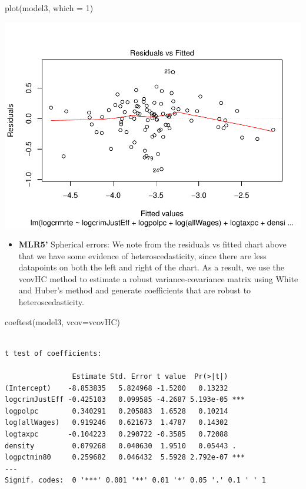 \documentclass[]{article}
\newenvironment{Shaded}{}{}
\newcommand{\DataTypeTok}[1]{#1}
\newcommand{\DecValTok}[1]{#1}
\newcommand{\KeywordTok}[1]{\textcolor[rgb]{0.00,0.00,1.00}{#1}}
\newcommand{\NormalTok}[1]{#1}
\providecommand{\tightlist}{%
  \setlength{\itemsep}{0pt}\setlength{\parskip}{0pt}}
\begin{document}
\begin{Shaded}
\begin{Highlighting}[]
\KeywordTok{plot}\NormalTok{(model3, }\DataTypeTok{which =} \DecValTok{1}\NormalTok{)}
\end{Highlighting}
\end{Shaded}

\includegraphics{Bagnard_Gaustad_Hartman_Leung_Lab_3_files/figure-latex/unnamed-chunk-102-1.pdf}

\begin{itemize}
\tightlist
\item
  \textbf{MLR5'} Spherical errors: We note from the residuals vs fitted
  chart above that we have some evidence of heteroscedasticity, since
  there are less datapoints on both the left and right of the chart. As
  a result, we use the vcovHC method to estimate a robust
  variance-covariance matrix using White and Huber's method and generate
  coefficients that are robust to heteroscedasticity.
\end{itemize}

\begin{Shaded}
\begin{Highlighting}[]
\KeywordTok{coeftest}\NormalTok{(model3, }\DataTypeTok{vcov=}\NormalTok{vcovHC)}
\end{Highlighting}
\end{Shaded}

\begin{verbatim}

t test of coefficients:

                Estimate Std. Error t value  Pr(>|t|)    
(Intercept)    -8.853835   5.824968 -1.5200   0.13232    
logcrimJustEff -0.425103   0.099585 -4.2687 5.193e-05 ***
logpolpc        0.340291   0.205883  1.6528   0.10214    
log(allWages)   0.919246   0.621673  1.4787   0.14302    
logtaxpc       -0.104223   0.290722 -0.3585   0.72088    
density         0.079268   0.040630  1.9510   0.05443 .  
logpctmin80     0.259682   0.046432  5.5928 2.792e-07 ***
---
Signif. codes:  0 '***' 0.001 '**' 0.01 '*' 0.05 '.' 0.1 ' ' 1
\end{verbatim}
\end{document}
